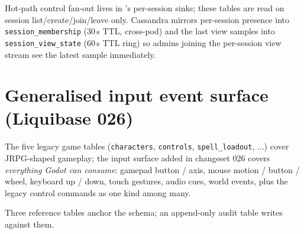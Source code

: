 \bigskip

Hot-path control fan-out lives in 's
per-session sinks; these tables are read on session
list/create/join/leave only. Cassandra mirrors per-session presence
into \texttt{session\_membership} (30\,s TTL, cross-pod) and the
last view samples into \texttt{session\_view\_state} (60\,s TTL ring)
so admins joining the per-session view stream see the latest sample
immediately.

\section{Generalised input event surface (Liquibase 026)}

The five legacy game tables (\texttt{characters}, \texttt{controls},
\texttt{spell\_loadout}, ...) cover JRPG-shaped gameplay; the input
surface added in changeset 026 covers \emph{everything Godot can
consume}: gamepad button / axis, mouse motion / button / wheel,
keyboard up / down, touch gestures, audio cues, world events,
plus the legacy control commands as one kind among many.

Three reference tables anchor the schema; an append-only audit
table writes against them.

